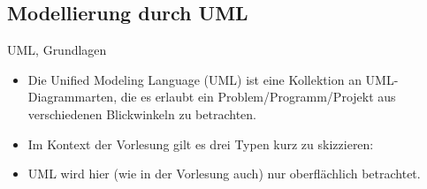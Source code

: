 \subsection{Modellierung durch UML}
\begin{frame}{UML, Grundlagen}
    \begin{itemize}[<+(1)->]
        \widei
        \item Die Unified Modeling Language (UML) ist eine Kollektion an UML-Diagrammarten,\pause{} die es erlaubt ein Problem\thinspace /\thinspace Programm\thinspace /\thinspace Projekt aus verschiedenen Blickwinkeln zu betrachten.
        \item Im Kontext der Vorlesung gilt es drei Typen kurz zu skizzieren: 
        \item UML wird hier (wie in der Vorlesung auch) nur oberflächlich betrachtet.
    \end{itemize}
\end{frame}

